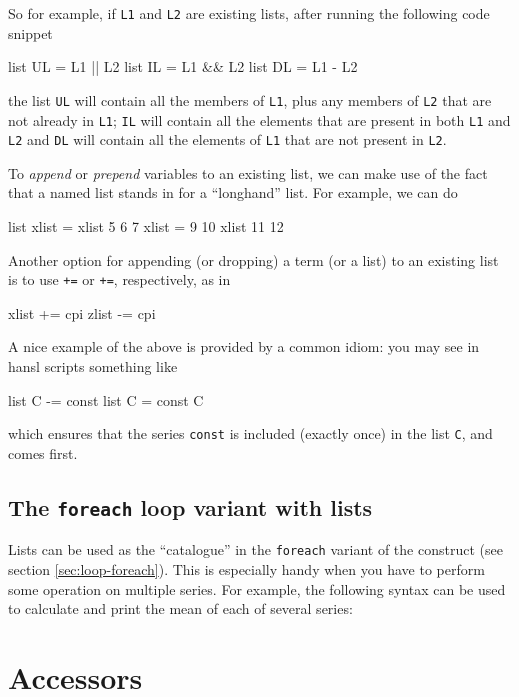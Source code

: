 So for example, if \texttt{L1} and \texttt{L2} are existing lists,
after running the following code snippet
\begin{code}
  list UL = L1 || L2 
  list IL = L1 && L2
  list DL = L1 - L2
\end{code}
the list \texttt{UL} will contain all the members of \texttt{L1}, plus
any members of \texttt{L2} that are not already in \texttt{L1};
\texttt{IL} will contain all the elements that are present in both
\texttt{L1} and \texttt{L2} and \texttt{DL} will contain all the
elements of \texttt{L1} that are not present in \texttt{L2}. 

To \textit{append} or \textit{prepend} variables to an existing list,
we can make use of the fact that a named list stands in for a
``longhand'' list.  For example, we can do
%
\begin{code}
list xlist = xlist 5 6 7
xlist = 9 10 xlist 11 12
\end{code}
 
Another option for appending (or dropping) a term (or a list) to an
existing list is to use \texttt{+=} or  \texttt{+=}, respectively, as in
\begin{code}
xlist += cpi
zlist -= cpi
\end{code}
A nice example of the above is provided by a common idiom: you may
see in hansl scripts something like
\begin{code}
  list C -= const
  list C = const C
\end{code}
which ensures that the series \texttt{const} is included (exactly
once) in the list \texttt{C}, and comes first.

\subsection{The \texttt{foreach} loop variant with lists}

Lists can be used as the ``catalogue'' in the \texttt{foreach} variant
of the  construct (see section \ref{sec:loop-foreach}). This
is especially handy when you have to perform some operation on
multiple series. For example, the following syntax can be used to
calculate and print the mean of each of several series:

\section{Accessors}
\label{sec:accessors}
 
